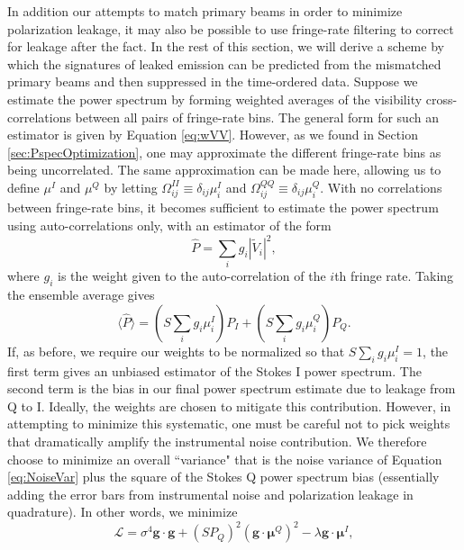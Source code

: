 \documentclass[twocolumn,apj,numberedappendix]{emulateapj}
\begin{document}
In addition our attempts to match primary beams in order to minimize polarization leakage, it may also
be possible to use fringe-rate filtering to correct for leakage after the fact. In the rest of this section, we
will derive a scheme by which the signatures of leaked emission can be predicted from the mismatched
primary beams and then suppressed in the time-ordered data. Suppose we estimate the power spectrum by forming weighted averages of the visibility cross-correlations between all
pairs of fringe-rate bins. The general form for such an estimator is given by Equation \eqref{eq:wVV}. However,
as we found in Section \ref{sec:PspecOptimization}, one may approximate the different fringe-rate bins as being
uncorrelated. The same approximation can be made here, allowing us to define $\mu^I$ and $\mu^Q$ by
letting $\Omega_{ij}^{II} \equiv \delta_{ij} \mu_i^I$ and $\Omega_{ij}^{QQ} \equiv \delta_{ij} \mu_i^Q$. With no
correlations between fringe-rate bins, it becomes sufficient to estimate the power spectrum using auto-correlations
only, with an estimator of the form
\begin{equation}
\widehat{P} = \sum_{i} g_{i}| \widetilde{V}_i |^2,
\end{equation}
where $g_i$ is the weight given to the auto-correlation of the $i$th fringe rate. Taking the ensemble average gives
\begin{equation}
\langle \widehat{P} \rangle = \left( S \sum_i g_i \mu^I_i \right) P_I + \left( S \sum_i g_i \mu^Q_i \right) P_Q.
\end{equation}
If, as before, we require our weights to be normalized so that $S \sum_i g_i \mu^I_i =1$, the first term gives an
unbiased estimator of the Stokes I power spectrum. The second term is the bias in our final power spectrum estimate
due to leakage from Q to I. Ideally, the weights are chosen to mitigate this contribution. However, in attempting to
minimize this systematic, one must be careful not to pick weights that dramatically amplify the instrumental noise
contribution. We therefore choose to minimize an overall ``variance" that is the noise variance of Equation
\eqref{eq:NoiseVar} plus the square of the Stokes Q power spectrum bias (essentially adding the error bars
from instrumental noise and polarization leakage in quadrature). In other words, we minimize
\begin{equation}
\mathcal L = \sigma^4 \mathbf{g} \cdot \mathbf{g} + \left(S P_Q \right)^2 \left(\mathbf{g} \cdot \boldsymbol \mu^Q \right)^2 - \lambda \mathbf{g} \cdot \boldsymbol \mu^I,
\end{equation}
\end{document}
